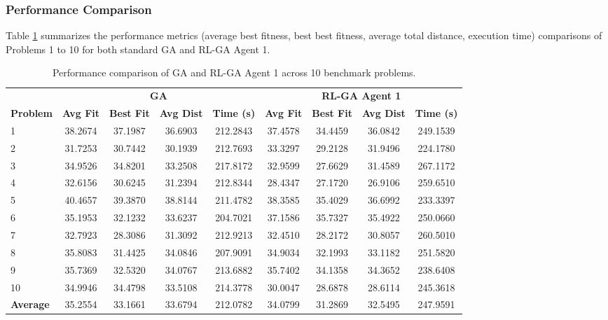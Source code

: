 \documentclass{article}
\begin{document}
\subsubsection{Performance Comparison}
Table \ref{tab:problem_comparison_rlga1} summarizes the performance metrics (average best fitness, best best fitness, average total distance, execution time) comparisons of Problems 1 to 10 for both standard GA and RL-GA Agent 1.
\begin{table}[H]
\centering
\small
\begin{tabular}{lcccccccc}
\toprule
& \multicolumn{4}{c}{\textbf{GA}} & \multicolumn{4}{c}{\textbf{RL-GA Agent 1}} \\
\cmidrule(lr){2-5} \cmidrule(lr){6-9}
\textbf{Problem} & \textbf{Avg Fit} & \textbf{Best Fit} & \textbf{Avg Dist} & \textbf{Time (s)}
& \textbf{Avg Fit} & \textbf{Best Fit} & \textbf{Avg Dist} & \textbf{Time (s)} \\
\midrule
1  & 38.2674 & 37.1987 & 36.6903 & 212.2843 & 37.4578 & 34.4459 & 36.0842 & 249.1539 \\
2  & 31.7253 & 30.7442 & 30.1939 & 212.7693 & 33.3297 & 29.2128 & 31.9496 & 224.1780 \\
3  & 34.9526 & 34.8201 & 33.2508 & 217.8172 & 32.9599 & 27.6629 & 31.4589 & 267.1172 \\
4  & 32.6156 & 30.6245 & 31.2394 & 212.8344 & 28.4347 & 27.1720 & 26.9106 & 259.6510 \\
5  & 40.4657 & 39.3870 & 38.8144 & 211.4782 & 38.3585 & 35.4029 & 36.6992 & 233.3397 \\
6  & 35.1953 & 32.1232 & 33.6237 & 204.7021 & 37.1586 & 35.7327 & 35.4922 & 250.0660 \\
7  & 32.7923 & 28.3086 & 31.3092 & 212.9213 & 32.4510 & 28.2172 & 30.8057 & 260.5010 \\
8  & 35.8083 & 31.4425 & 34.0846 & 207.9091 & 34.9034 & 32.1993 & 33.1182 & 251.5820 \\
9  & 35.7369 & 32.5320 & 34.0767 & 213.6882 & 35.7402 & 34.1358 & 34.3652 & 238.6408 \\
10 & 34.9946 & 34.4798 & 33.5108 & 214.3778 & 30.0047 & 28.6878 & 28.6114 & 245.3618 \\
\midrule
\textbf{Average} & 35.2554 & 33.1661 & 33.6794 & 212.0782 & 34.0799 & 31.2869 & 32.5495 & 247.9591 \\
\bottomrule
\end{tabular}
\caption{Performance comparison of GA and RL-GA Agent 1 across 10 benchmark problems.}
\label{tab:problem_comparison_rlga1}
\end{table}
\end{document}
